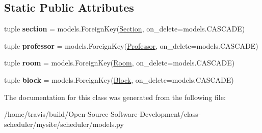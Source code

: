 \subsection*{Static Public Attributes}
\begin{DoxyCompactItemize}
\item 
\hypertarget{classscheduler_1_1models_1_1_hunk_a24e5838d535817f4d0cb27f8fb6edd36}{tuple {\bfseries section} = models.\-Foreign\-Key(\hyperlink{classscheduler_1_1models_1_1_section}{Section}, on\-\_\-delete=models.\-C\-A\-S\-C\-A\-D\-E)}\label{classscheduler_1_1models_1_1_hunk_a24e5838d535817f4d0cb27f8fb6edd36}

\item 
\hypertarget{classscheduler_1_1models_1_1_hunk_aa01e29b62d649ce7cd0ccc0e35b51747}{tuple {\bfseries professor} = models.\-Foreign\-Key(\hyperlink{classscheduler_1_1models_1_1_professor}{Professor}, on\-\_\-delete=models.\-C\-A\-S\-C\-A\-D\-E)}\label{classscheduler_1_1models_1_1_hunk_aa01e29b62d649ce7cd0ccc0e35b51747}

\item 
\hypertarget{classscheduler_1_1models_1_1_hunk_ac50c8aaab3e58e9bf1ff953f4246f21a}{tuple {\bfseries room} = models.\-Foreign\-Key(\hyperlink{classscheduler_1_1models_1_1_room}{Room}, on\-\_\-delete=models.\-C\-A\-S\-C\-A\-D\-E)}\label{classscheduler_1_1models_1_1_hunk_ac50c8aaab3e58e9bf1ff953f4246f21a}

\item 
\hypertarget{classscheduler_1_1models_1_1_hunk_ab6e2df449de158fcf00218f6f2e63832}{tuple {\bfseries block} = models.\-Foreign\-Key(\hyperlink{classscheduler_1_1models_1_1_block}{Block}, on\-\_\-delete=models.\-C\-A\-S\-C\-A\-D\-E)}\label{classscheduler_1_1models_1_1_hunk_ab6e2df449de158fcf00218f6f2e63832}

\end{DoxyCompactItemize}


The documentation for this class was generated from the following file\-:\begin{DoxyCompactItemize}
\item 
/home/travis/build/\-Open-\/\-Source-\/\-Software-\/\-Development/class-\/scheduler/mysite/scheduler/models.\-py\end{DoxyCompactItemize}
